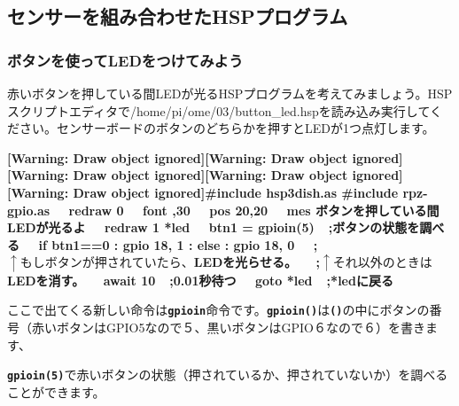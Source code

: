 \documentclass[a4paper,dvipdfmx]{jarticle}
\begin{document}
\subsection{}
\clearpage\subsection{センサーを組み合わせたHSPプログラム}
\subsubsection{ボタンを使ってLEDをつけてみよう}
赤いボタンを押している間LEDが光るHSPプログラムを考えてみましょう。HSPスクリプトエディタで/home/pi/ome/03/button\_led.hspを読み込み実行してください。センサーボードのボタンのどちらかを押すとLEDが1つ点灯します。

{\ttfamily\bfseries
[Warning: Draw object ignored][Warning: Draw object ignored][Warning: Draw object ignored][Warning: Draw object
ignored][Warning: Draw object ignored]\#include {\textquotedbl}hsp3dish.as{\textquotedbl}\newline
\#include {\textquotedbl}rpz-gpio.as{\textquotedbl}\newline
\newline
 \ \ redraw 0\newline
 \ \ font {\textquotedbl}{\textquotedbl},30\newline
 \ \ pos 20,20\newline
 \ \ mes
{\textquotedbl}ボタンを押している間LEDが光るよ{\textquotedbl}\newline
 \ \ redraw 1\newline
\newline
*led\newline
 \ \ btn1 = gpioin(5)\ \ ;ボタンの状態を調べる\newline
 \ \ if btn1==0 : gpio 18, 1 : else : gpio 18, 0 \newline
\ \ ;$\uparrow
もしボタンが押されていたら、$LEDを光らせる。\newline
\ \ ;$\uparrow それ以外のときは$LEDを消す。\newline
 \ \ await 10\ \ ;0.01秒待つ\newline
 \ \ goto *led\ \ ;*ledに戻る}

ここで出てくる新しい命令は\texttt{\textbf{gpioin}}命令です。\texttt{\textbf{gpioin()}}は\texttt{\textbf{()}}の中にボタンの番号（赤いボタンはGPIO5なので５、黒いボタンはGPIO６なので６）を書きます、

\texttt{\textbf{gpioin(5)}}で赤いボタンの状態（押されているか、押されていないか）を調べることができます。
\end{document}
